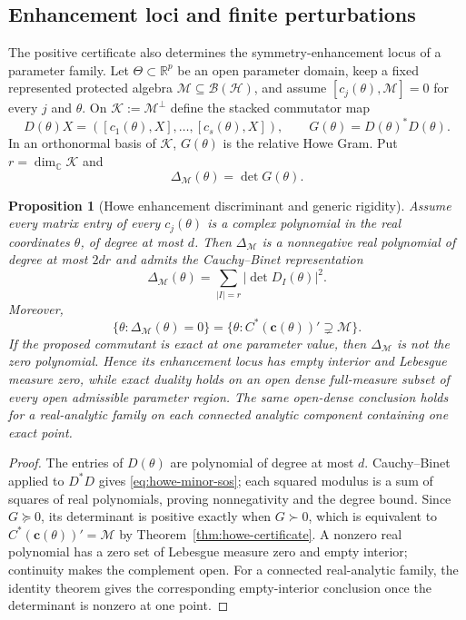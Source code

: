 \documentclass[11pt]{article}
\numberwithin{equation}{section}
\newtheorem{proposition}[theorem]{Proposition}
\theoremstyle{definition}
\theoremstyle{remark}
\newcommand{\R}{\mathbb R}
\newcommand{\C}{\mathbb C}
\newcommand{\Hh}{\mathcal H}
\newcommand{\M}{\mathcal M}
\newcommand{\Kk}{\mathcal K}
\begin{document}
\subsection{Enhancement loci and finite perturbations}
\label{sec:howe-discriminant}

The positive certificate also determines the symmetry-enhancement locus of a
parameter family.  Let $\Theta\subset\R^p$ be an open parameter domain, keep a
fixed represented protected algebra $\M\subseteq\mathcal B(\Hh)$, and assume
$[c_j(\theta),\M]=0$ for every $j$ and $\theta$.  On
$\Kk:=\M^\perp$ define the stacked commutator map
\[
 D(\theta)X=([c_1(\theta),X],\ldots,[c_s(\theta),X]),
 \qquad G(\theta)=D(\theta)^*D(\theta).
\]
In an orthonormal basis of $\Kk$, $G(\theta)$ is the relative Howe Gram.
Put $r=\dim_\C\Kk$ and
\begin{equation}
 \Delta_{\M}(\theta)=\det G(\theta).
 \label{eq:howe-discriminant}
\end{equation}

\begin{proposition}[Howe enhancement discriminant and generic rigidity]
\label{thm:howe-discriminant}
Assume every matrix entry of every $c_j(\theta)$ is a complex polynomial in
the real coordinates $\theta$, of degree at most $d$.  Then
$\Delta_{\M}$ is a nonnegative real polynomial of degree at most $2dr$ and
admits the Cauchy--Binet representation
\begin{equation}
 \Delta_{\M}(\theta)
 =\sum_{|I|=r}|\det D_I(\theta)|^2.
 \label{eq:howe-minor-sos}
\end{equation}
Moreover,
\begin{equation}
 \{\theta:\Delta_{\M}(\theta)=0\}
 =\{\theta:C^*(\bm c(\theta))'\supsetneq\M\}.
 \label{eq:howe-enhancement-locus}
\end{equation}
If the proposed commutant is exact at one parameter value, then
$\Delta_{\M}$ is not the zero polynomial.  Hence its enhancement locus has
empty interior and Lebesgue measure zero, while exact duality holds on an open
dense full-measure subset of every open admissible parameter region.  The same
open-dense conclusion holds for a real-analytic family on each connected
analytic component containing one exact point.
\end{proposition}

\begin{proof}
The entries of $D(\theta)$ are polynomial of degree at most $d$.
Cauchy--Binet applied to $D^*D$ gives
\eqref{eq:howe-minor-sos}; each squared modulus is a sum of squares of real
polynomials, proving nonnegativity and the degree bound.  Since $G\succeq0$,
its determinant is positive exactly when $G\succ0$, which is equivalent to
$C^*(\bm c(\theta))'=\M$ by Theorem~\ref{thm:howe-certificate}.  A nonzero
real polynomial has a zero set of Lebesgue measure zero and empty interior;
continuity makes the complement open.  For a connected real-analytic family,
the identity theorem gives the corresponding empty-interior conclusion once
the determinant is nonzero at one point.
\end{proof}
\end{document}
